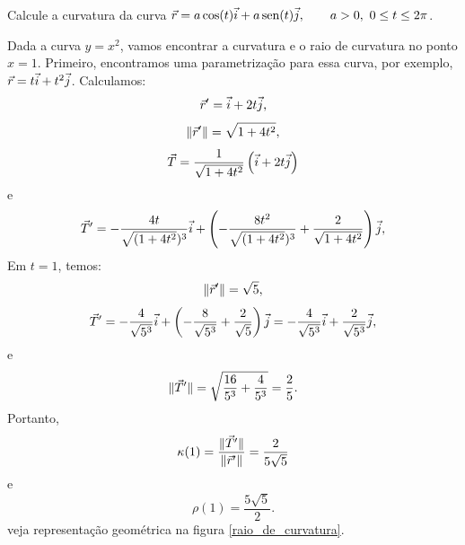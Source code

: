 \begin{exer}Calcule a curvatura da curva $\vec{r}=a\cos(t)\vec{i}+a\operatorname{sen}(t)\vec{j},\qquad a>0,\ 0\leq t\leq 2\pi$.
\end{exer}
\begin{ex}Dada a curva $y=x^2$, vamos encontrar a curvatura e o raio de curvatura no ponto $x=1$. Primeiro, encontramos uma parametrização para essa curva, por exemplo, $\vec{r}=t\vec{i}+t^2\vec{j}$. Calculamos:
$$
\vec{r}'=\vec{i}+2t\vec{j},
$$
$$
\|\vec{r}'\|=\sqrt{1+4t^2},
$$
$$
\vec{T}=\frac{1}{\sqrt{1+4t^2}}\left(\vec{i}+2t\vec{j}\right)
$$
e
$$
\vec{T}'=-\frac{4t}{\sqrt{(1+4t^2})^3}\vec{i}+\left(-\frac{8t^2}{\sqrt{(1+4t^2})^3}+\frac{2}{\sqrt{1+4t^2}}\right)\vec{j},
$$
Em $t=1$, temos:
$$
\|\vec{r}'\|=\sqrt{5},
$$
$$
\vec{T}'=-\frac{4}{\sqrt{5^3}}\vec{i}+\left(-\frac{8}{\sqrt{5^3}}+\frac{2}{\sqrt{5}}\right)\vec{j}=-\frac{4}{\sqrt{5^3}}\vec{i}+\frac{2}{\sqrt{5^3}}\vec{j},
$$
e
$$
\|\vec{T}'\|=\sqrt{\frac{16}{5^3}+\frac{4}{5^3}}=\frac{2}{5}.
$$
Portanto,
$$
\kappa(1)=\frac{\|\vec{T}'\|}{\|\vec{r}'\|}=\frac{2}{5\sqrt{5}}
$$
e
$$
\rho(1)=\frac{5\sqrt{5}}{2}.
$$
veja representação geométrica na figura \ref{raio_de_curvatura}.
\end{ex}

